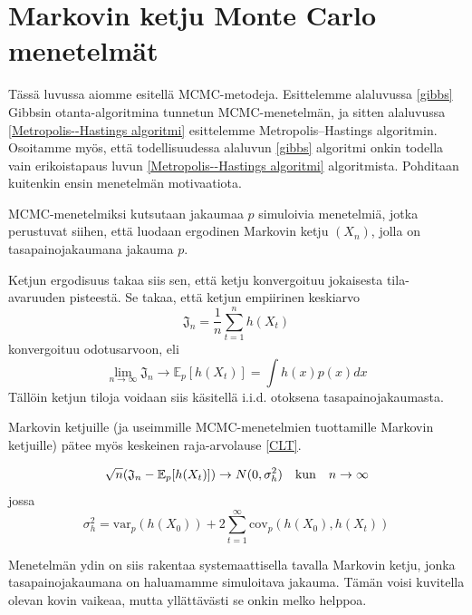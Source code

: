 \chapter{Markovin ketju Monte Carlo menetelmät}

Tässä luvussa aiomme esitellä MCMC-metodeja. Esittelemme alaluvussa \ref{gibbs} Gibbsin otanta-algoritmina tunnetun MCMC-menetelmän, ja sitten alaluvussa \ref{Metropolis--Hastings algoritmi} esittelemme Metropolis--Hastings algoritmin. Osoitamme myös, että todellisuudessa alaluvun \ref{gibbs} algoritmi onkin todella vain erikoistapaus luvun \ref{Metropolis--Hastings algoritmi} algoritmista. Pohditaan kuitenkin ensin menetelmän motivaatiota. \cite[s.~94]{koistinen_computational_2009} \cite[s.~269]{monte_carlo_book}
 
\begin{maar}
	MCMC-menetelmiksi kutsutaan jakaumaa $p$ simuloivia menetelmiä, jotka perustuvat siihen, että luodaan ergodinen Markovin ketju $(X_n)$, jolla on tasapainojakaumana jakauma $p$.
\end{maar}

Ketjun ergodisuus takaa siis sen, että ketju konvergoituu jokaisesta tila-avaruuden pisteestä. Se takaa, että ketjun empiirinen keskiarvo
\begin{equation}
	\mathfrak{J}_n = \frac{1}{n} \sum_{t=1}^{n} h(X_t)
\end{equation}
konvergoituu odotusarvoon, eli
\begin{equation}
	\lim_{n\to\infty} \mathfrak J_n \to \mathbb{E}_p[h(X_t)] = \int h(x)p(x)dx
\end{equation}
Tällöin ketjun tiloja voidaan siis käsitellä i.i.d. otoksena tasapainojakaumasta.

Markovin ketjuille (ja useimmille MCMC-menetelmien tuottamille Markovin ketjuille) pätee myös keskeinen raja-arvolause \eqref{CLT}.

\begin{equation}\label{CLT}
	\sqrt{n}\qty(\mathfrak{J}_n-\mathbb{E}_p[h(X_t)]) \to N(0, \sigma^2_h) \qq{kun} n\to\infty
\end{equation}
jossa 
\begin{equation}
	\sigma^2_h = \text{var}_p(h(X_0))+2\sum_{t=1}^{\infty}\text{cov}_p(h(X_0),h(X_t))
\end{equation}

Menetelmän ydin on siis rakentaa systemaattisella tavalla Markovin ketju, jonka tasapainojakaumana on haluamamme simuloitava jakauma. Tämän voisi kuvitella olevan kovin vaikeaa, mutta yllättävästi se onkin melko helppoa.

